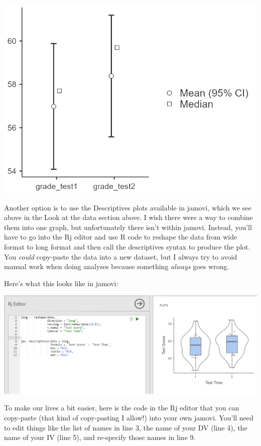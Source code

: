 \documentclass[
]{book}
\begin{document}
\includegraphics{images/03_dependent_t-test/dependent_results_plot.png}

Another option is to use the Descriptives plots available in jamovi, which we see above in the Look at the data section above. I wish there were a way to combine them into one graph, but unfortunately there isn't within jamovi. Instead, you'll have to go into the Rj editor and use R code to reshape the data from wide format to long format and then call the descriptives syntax to produce the plot. You \emph{could} copy-paste the data into a new dataset, but I always try to avoid manual work when doing analyses because something \emph{always} goes wrong.

Here's what this looks like in jamovi:

\includegraphics{images/03_dependent_t-test/dependent_results_plot2.png}

To make our lives a bit easier, here is the code in the Rj editor that you can copy-paste (that kind of copy-pasting I allow!) into your own jamovi. You'll need to edit things like the list of names in line 3, the name of your DV (line 4), the name of your IV (line 5), and re-specify those names in line 9.
\end{document}
